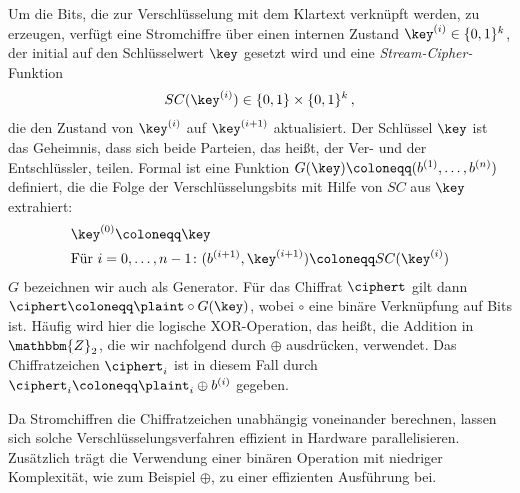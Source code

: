 Um die Bits, die zur Verschlüsselung mit dem Klartext verknüpft werden, zu erzeugen, verfügt eine Stromchiffre über einen internen Zustand $\key^{(i)} \in \{0,1\}^k$, der initial auf den Schlüsselwert $\key$ gesetzt wird und eine \emph{Stream-Cipher-}Funktion
\begin{align*}
	SC(\key^{(i)}) \in \{0,1\} \times \{0,1\}^k\, ,
\end{align*}
die den Zustand von $\key^{(i)}$ auf $\key^{(i+1)}$ aktualisiert. Der Schlüssel $\key$ ist das Geheimnis, dass sich beide Parteien, das heißt, der Ver- und der Entschlüssler, teilen. Formal ist eine Funktion $G(\key) \coloneqq (b^{(1)},\dots,b^{(n)})$ definiert, die die Folge der Verschlüsselungsbits mit Hilfe von $SC$ aus $\key$ extrahiert:
\begin{align*}
	&\key^{(0)} \coloneqq \key\\
	&\textnormal{Für } i = 0,\dots,n-1\colon (b^{(i+1)},\key^{(i+1)}) \coloneqq SC(\key^{(i)}) 
\end{align*}
$G$ bezeichnen wir auch als Generator. Für das Chiffrat $\ciphert$ gilt dann $\ciphert \coloneqq \plaint \circ G(\key)$, wobei $\circ$ eine binäre Verknüpfung auf Bits ist. Häufig wird hier die logische XOR-Operation, das heißt, die Addition in $\mathbbm{Z}_{2}$, die wir nachfolgend durch $\oplus$ ausdrücken, verwendet. Das Chiffratzeichen $\ciphert_{i}$ ist in diesem Fall durch $\ciphert_{i} \coloneqq \plaint_{i} \oplus b^{(i)}$ gegeben. 

Da Stromchiffren die Chiffratzeichen unabhängig voneinander berechnen, lassen sich solche Verschlüsselungsverfahren effizient in Hardware parallelisieren. Zusätzlich trägt die Verwendung einer binären Operation mit niedriger Komplexität, wie zum Beispiel $\oplus$, zu einer effizienten Ausführung bei.

